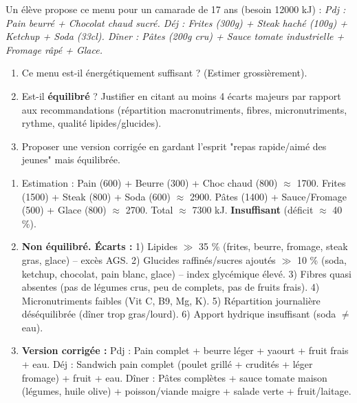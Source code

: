 \documentclass[11pt]{article}
\begin{document}
\begin{exercice}
Un élève propose ce menu pour un camarade de 17 ans (besoin 12000 kJ) :
\textit{Pdj : Pain beurré + Chocolat chaud sucré. Déj : Frites (300g) + Steak haché (100g) + Ketchup + Soda (33cl). Dîner : Pâtes (200g cru) + Sauce tomate industrielle + Fromage râpé + Glace.}
\begin{enumerate}
    \item Ce menu est-il énergétiquement suffisant ? (Estimer grossièrement).
    \item Est-il \textbf{équilibré} ? Justifier en citant au moins 4 écarts majeurs par rapport aux recommandations (répartition macronutriments, fibres, micronutriments, rythme, qualité lipides/glucides).
    \item Proposer une version corrigée en gardant l'esprit "repas rapide/aimé des jeunes" mais équilibrée.
\end{enumerate}
\end{exercice}

\begin{corrige}[Exercice n°2]
\begin{enumerate}
    \item Estimation : Pain (600) + Beurre (300) + Choc chaud (800) $\approx$ 1700. Frites (1500) + Steak (800) + Soda (600) $\approx$ 2900. Pâtes (1400) + Sauce/Fromage (500) + Glace (800) $\approx$ 2700. Total $\approx$ 7300 kJ. \textbf{Insuffisant} (déficit $\approx$ 40 \%).
    \item \textbf{Non équilibré. Écarts :} 1) Lipides $\gg$ 35 \% (frites, beurre, fromage, steak gras, glace) -- excès AGS. 2) Glucides raffinés/sucres ajoutés $\gg$ 10 \% (soda, ketchup, chocolat, pain blanc, glace) -- index glycémique élevé. 3) Fibres quasi absentes (pas de légumes crus, peu de complets, pas de fruits frais). 4) Micronutriments faibles (Vit C, B9, Mg, K). 5) Répartition journalière déséquilibrée (dîner trop gras/lourd). 6) Apport hydrique insuffisant (soda $\neq$ eau).
    \item \textbf{Version corrigée :} Pdj : Pain complet + beurre léger + yaourt + fruit frais + eau. Déj : Sandwich pain complet (poulet grillé + crudités + léger fromage) + fruit + eau. Dîner : Pâtes complètes + sauce tomate maison (légumes, huile olive) + poisson/viande maigre + salade verte + fruit/laitage.
\end{enumerate}
\end{corrige}
\end{document}
